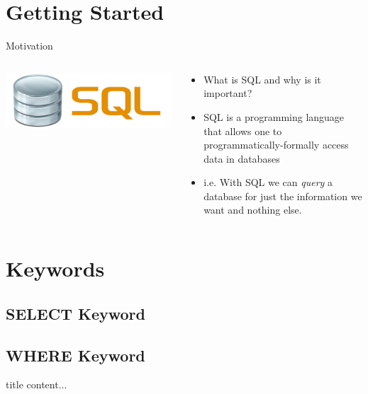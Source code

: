 \documentclass{beamer}
\begin{document}
	\section{Getting Started}
	\begin{frame}{Motivation}
		\begin{columns}
		\begin{column}{.5 \textwidth}
			\includegraphics[width=1 \textwidth]{sql_image.png}
		\end{column}			
			\begin{column}{.5 \textwidth}
		\begin{itemize}
			\item What is SQL and why is it important? \pause
			\item SQL is a programming language that allows one to programmatically-formally access data in databases \pause
			\item i.e. With SQL we can \textit{query} a database for just the information we want and nothing else.
		\end{itemize}
			\end{column}
		\end{columns}
	\end{frame}
	\section{Keywords}
	\subsection{SELECT Keyword}
	\begin{frame}{}
		
	\end{frame}
	
	\subsection{WHERE Keyword}
	\begin{frame}{title}
		content...
	\end{frame}
	
\end{document}

